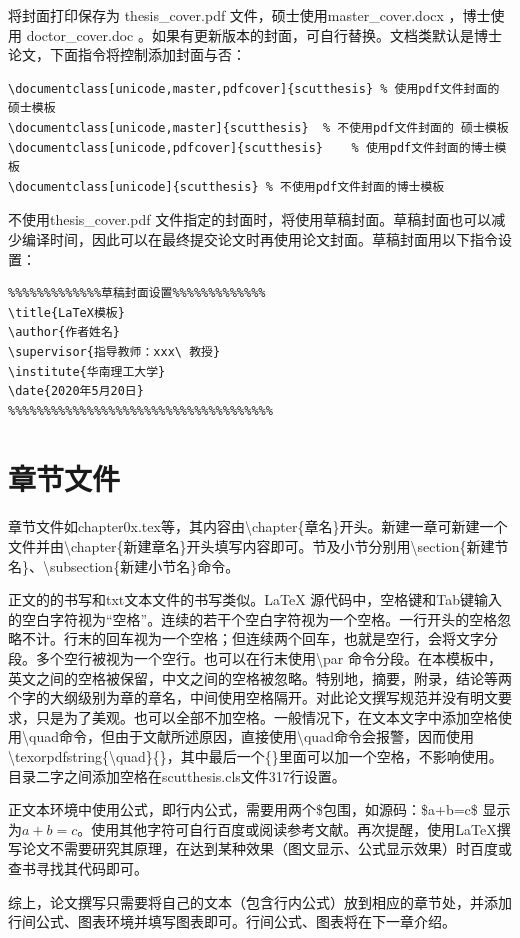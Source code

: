 将封面打印保存为 thesis\_cover.pdf 文件，硕士使用master\_cover.docx ，博士使用 doctor\_cover.doc 。如果有更新版本的封面，可自行替换。文档类默认是博士论文，下面指令将控制添加封面与否：
\begin{lstlisting}
\documentclass[unicode,master,pdfcover]{scutthesis}	% 使用pdf文件封面的 硕士模板
\documentclass[unicode,master]{scutthesis}	% 不使用pdf文件封面的 硕士模板
\documentclass[unicode,pdfcover]{scutthesis}	% 使用pdf文件封面的博士模板
\documentclass[unicode]{scutthesis}	% 不使用pdf文件封面的博士模板
\end{lstlisting}
不使用thesis\_cover.pdf 文件指定的封面时，将使用草稿封面。草稿封面也可以减少编译时间，因此可以在最终提交论文时再使用论文封面。草稿封面用以下指令设置：
\begin{lstlisting}
%%%%%%%%%%%%%草稿封面设置%%%%%%%%%%%%%	
\title{LaTeX模板}	
\author{作者姓名}	
\supervisor{指导教师：xxx\ 教授}	
\institute{华南理工大学}	
\date{2020年5月20日}
%%%%%%%%%%%%%%%%%%%%%%%%%%%%%%%%%%%%%
\end{lstlisting}
\section{章节文件}
章节文件如chapter0x.tex等，其内容由\textbackslash{}chapter\{章名\}开头。新建一章可新建一个文件并由\textbackslash{}chapter\{新建章名\}开头填写内容即可。节及小节分别用\textbackslash{}section\{新建节名\}、\textbackslash{}subsection\{新建小节名\}命令。

正文的的书写和txt文本文件的书写类似。\LaTeX{} 源代码中，空格键和Tab键输入的空白字符视为“空格”。连续的若干个空白字符视为一个空格。一行开头的空格忽略不计。行末的回车视为一个空格；但连续两个回车，也就是空行，会将文字分段。多个空行被视为一个空行。也可以在行末使用\textbackslash{}par 命令分段。在本模板中，英文之间的空格被保留，中文之间的空格被忽略。特别地，摘要，附录，结论等两个字的大纲级别为章的章名，中间使用空格隔开。对此论文撰写规范并没有明文要求，只是为了美观。也可以全部不加空格。一般情况下，在文本文字中添加空格使用\textbackslash{}quad命令，但由于文献\parencite{_d}所述原因，直接使用\textbackslash{}quad命令会报警，因而使用\textbackslash{}texorpdfstring\{\textbackslash{}quad\}\{\}，其中最后一个\{\}里面可以加一个空格，不影响使用。目录二字之间添加空格在scutthesis.cls文件317行设置。

正文本环境中使用公式，即行内公式，需要用两个\$包围，如源码：\$a+b=c\$ 显示为$a+b=c$。使用其他字符可自行百度或阅读参考文献。再次提醒，使用\LaTeX{}撰写论文不需要研究其原理，在达到某种效果（图文显示、公式显示效果）时百度或查书寻找其代码即可。

综上，论文撰写只需要将自己的文本（包含行内公式）放到相应的章节处，并添加行间公式、图表环境并填写图表即可。行间公式、图表将在下一章介绍。

